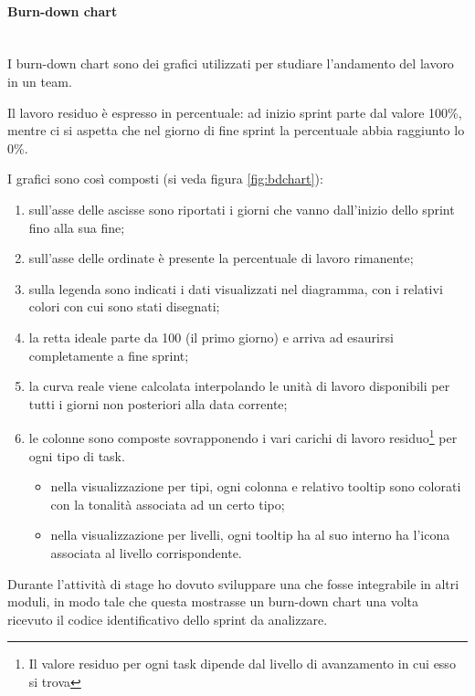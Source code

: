 \paragraph{Burn-down chart} \mbox{} \\

I burn-down chart sono dei grafici utilizzati per studiare l'andamento del
lavoro in un team.

Il lavoro residuo è espresso in percentuale: ad inizio sprint parte dal
valore 100\%, mentre ci si aspetta che nel giorno di fine sprint la
percentuale abbia raggiunto lo 0\%.

I grafici sono così composti (si veda figura \ref{fig:bdchart}):

\begin{enumerate}
\item sull'asse delle ascisse sono riportati i giorni che vanno dall'inizio
  dello sprint fino alla sua fine;
\item sull'asse delle ordinate è presente la percentuale di lavoro rimanente;
\item sulla legenda sono indicati i dati visualizzati nel diagramma, con i
  relativi colori con cui sono stati disegnati;
\item la retta ideale parte da 100 (il primo giorno) e arriva ad esaurirsi
  completamente a fine sprint;
\item la curva reale viene calcolata interpolando le unità di lavoro
  disponibili per tutti i giorni non posteriori alla data corrente;
\item le colonne sono composte sovrapponendo i vari carichi di lavoro
  residuo\footnote{Il valore residuo per ogni task dipende dal livello di
  avanzamento in cui esso si trova} per ogni tipo di task.
  \begin{itemize}
  \item nella visualizzazione per tipi, ogni colonna e relativo tooltip sono
    colorati con la tonalità associata ad un certo tipo;
  \item nella visualizzazione per livelli, ogni tooltip ha al suo interno ha
    l'icona associata al livello corrispondente.
  \end{itemize}
\end{enumerate}

Durante l'attività di stage ho dovuto sviluppare una  che
fosse integrabile in altri moduli, in modo tale che questa mostrasse un
burn-down chart una volta ricevuto il codice identificativo dello sprint da
analizzare.

